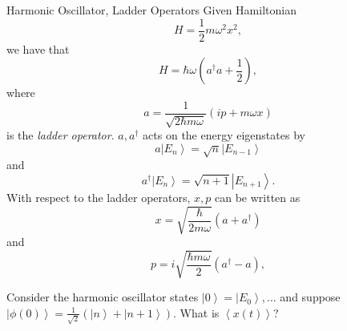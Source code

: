 \documentclass[phys334]{subfiles}
\begin{document}
    \begin{summary}{Harmonic Oscillator, Ladder Operators}
        Given Hamiltonian
        \begin{equation*}
            H = \frac{1}{2}m\omega^{2}x^{2},
        \end{equation*}
        we have that
        \begin{equation*}
            H = \hbar\omega\left( a^{\dagger}a+\frac{1}{2} \right),
        \end{equation*}
        where
        \begin{equation*}
            a = \frac{1}{\sqrt{2\hbar m\omega}}\left( ip+m\omega x \right)
        \end{equation*}
        is the \textit{ladder operator}. $a,a^{\dagger}$ acts on the energy eigenstates by
        \begin{equation*}
            a\left| E_n \right\rangle = \sqrt{n}\left| E_{n-1} \right\rangle
        \end{equation*}
        and
        \begin{equation*}
            a^{\dagger}\left| E_n \right\rangle = \sqrt{n+1}\left| E_{n+1} \right\rangle .
        \end{equation*}
        With respect to the ladder operators, $x,p$ can be written as
        \begin{equation*}
            x = \sqrt{\frac{\hbar}{2m\omega}}\left( a+a^{\dagger} \right)
        \end{equation*}
        and
        \begin{equation*}
            p = i\sqrt{\frac{\hbar m\omega}{2}}\left( a^{\dagger}-a \right),
        \end{equation*}
    \end{summary}

    \begin{example}{}
        Consider the harmonic oscillator states $\left| 0 \right\rangle = \left| E_0 \right\rangle, \ldots$ and suppose $\left| \phi\left( 0 \right) \right\rangle = \frac{1}{\sqrt{2}}\left( \left| n \right\rangle+\left| n+1 \right\rangle \right)$. What is $\left< x\left( t \right) \right>$? 
    \end{example}
\end{document}

